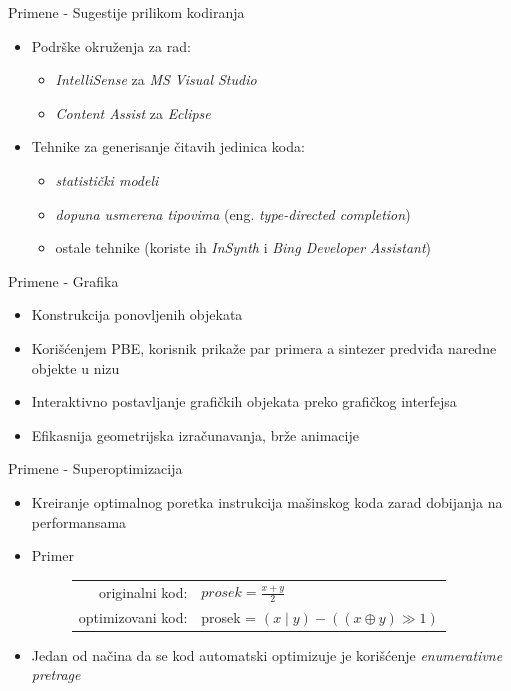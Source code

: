 \begin{frame}{Primene - Sugestije prilikom kodiranja}
    \begin{itemize}
        \item Podrške okruženja za rad:
        \begin{itemize}
            \item \emph{IntelliSense} za \emph{MS Visual Studio}
            \item \emph{Content Assist} za \emph{Eclipse}
        \end{itemize}
        \item Tehnike za generisanje čitavih jedinica koda:
        \begin{itemize}
            \item \emph{statistički modeli}
            \item \emph{dopuna usmerena tipovima} (eng. \emph{type-directed completion})
            \item ostale tehnike (koriste ih \emph{InSynth} i \emph{Bing Developer Assistant})
        \end{itemize}
    \end{itemize}
\end{frame}

\begin{frame}{Primene - Grafika}
    \begin{itemize}
        \item Konstrukcija ponovljenih objekata
        \item Korišćenjem PBE, korisnik prikaže par primera a sintezer predviđa naredne objekte u nizu
        \item Interaktivno postavljanje grafičkih objekata preko grafičkog interfejsa
        \item Efikasnija geometrijska izračunavanja, brže animacije
    \end{itemize}
\end{frame}

\begin{frame}{Primene - Superoptimizacija}
    \begin{itemize}
        \item Kreiranje optimalnog poretka instrukcija mašinskog koda zarad dobijanja na performansama
        \item Primer
        \begin{figure}[!h]
            \centering
            \small
            \begin{tabular}{rl}
                originalni kod: & $\mathit{prosek}=\frac{x+y}{2}$\\
                optimizovani kod: & prosek = $(x \mid y)-((x \oplus y) \gg 1)$
            \end{tabular}
        \end{figure}
        \item Jedan od načina da se kod automatski optimizuje je korišćenje  \emph{enumerativne pretrage}
    \end{itemize}
\end{frame}

